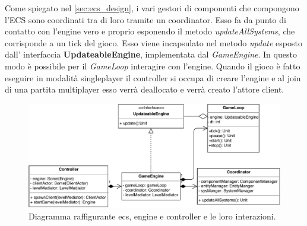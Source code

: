 	Come spiegato nel \ref{sec:ecs_design}, i vari gestori di componenti che compongono l'ECS sono coordinati tra di loro tramite un coordinator. Esso fa da punto di contatto con l'engine vero e proprio esponendo il metodo \emph{updateAllSystems}, che corrisponde a un tick del gioco. Esso viene incapsulato nel metodo \emph{update} esposto dall' interfaccia \textbf{UpdateableEngine}, implementata dal \emph{GameEngine}. In questo modo è possibile per il \emph{GameLoop} interagire con l'engine.
	Quando il gioco è fatto eseguire in modalità singleplayer il controller si occupa di creare l'engine e al join di una partita multiplayer esso verrà deallocato e verrà creato l'attore client.
	\begin{figure}[H]
		\centering
		\includegraphics[width=\columnwidth]{drawio/ECS-engine-controller/ecs-engine-controller.pdf}
		\caption{Diagramma raffigurante ecs, engine e controller e le loro interazioni.}
		\label{fig:ecsenginecontroller}
	\end{figure}
